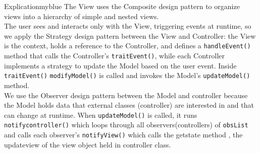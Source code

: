 \vspace{0.25cm}
\begin{prettyBox}{Explication}{myblue}
The View uses the Composite design pattern to organize views into a hierarchy of simple and nested views.\\[0.15cm]
The user sees and interacts only with the View, triggering events at runtime, so we apply the Strategy design
pattern between the View and Controller: the View is the context, holds a reference to the Controller, and defines
a \texttt{handleEvent()} method that calls the Controller’s \texttt{traitEvent()}, while each Controller implements
a strategy to update the Model based on the user event. Inside \texttt{traitEvent()} \texttt{modifyModel()} is called and invokes
the Model’s \texttt{updateModel()} method.\\[0.15cm]
We use the Observer design pattern between the Model and controller because the Model holds data that external classes
(controller) are interested in and that can change at runtime. When \texttt{updateModel()} is called, it runs \texttt{notifycontroller()} 
which loops through all observers(controllers) of \texttt{obsList} and calls each observer’s \texttt{notifyView()} which calls 
the getstate method , the updateview of the view object held in controller class.
\end{prettyBox}


